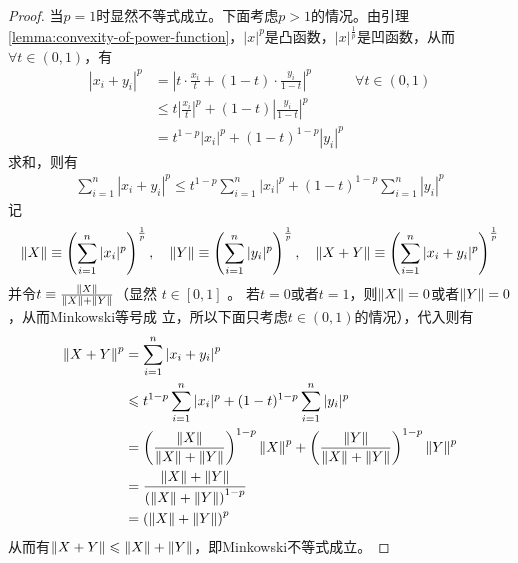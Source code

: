 \begin{proof}
  当$p=1$时显然不等式成立。下面考虑$p>1$的情况。由引理\ref{lemma:convexity-of-power-function}，$|x|^p$是凸函数，$|x|^{\frac{1}{p}}$是凹函数，从而$\forall t\in(0,1)$，有
  \begin{align*}
    \left|x_i + y_i\right|^p &= \left|t\cdot\frac{x_i}{t} + (1-t)\cdot\frac{y_i}{1-t}\right|^p & \forall t\in (0,1)\\
    &\le t \left|\frac{x_i}{t}\right|^p + (1-t)\left|\frac{y_i}{1-t}\right|^p \\
    &= t^{1-p}|x_i|^p + (1-t)^{1-p}|y_i|^p
  \end{align*}
  求和，则有
  \begin{align*}
    \sum_{i=1}^{n}\left|x_i+y_i\right|^p \le
    t^{1-p}\sum_{i=1}^{n}|x_i|^p + (1-t)^{1-p}\sum_{i=1}^{n}|y_i|^p
  \end{align*}
  记
  \begin{align*}
    \left\lVert{X}\right\rVert  \equiv\left(\sum_{i=1}^{n} |x_i|^p\right)^{\frac1p},\quad
    \left\lVert{Y}\right\rVert  \equiv\left(\sum_{i=1}^{n} |y_i|^p\right)^{\frac1p},\quad
    \left\lVert{X+Y}\right\rVert\equiv\left(\sum_{i=1}^{n} |x_i+y_i|^p\right)^{\frac1p}
  \end{align*}
  并令$t\equiv\frac{\left\lVert{X}\right\rVert}{\left\lVert{X}\right\rVert+\left\lVert{Y}\right\rVert}$（显然 $t\in[0,1]$ 。
  若$t=0$或者$t=1$，则$\left\lVert{X}\right\rVert=0$或者$\left\lVert{Y}\right\rVert=0$，从而Minkowski等号成
  立，所以下面只考虑$t\in(0,1)$的情况），代入则有
  \begin{align*}
    \left\lVert{X + Y}\right\rVert^p &= \sum_{i=1}^{n}\left|x_i+y_i\right|^p\\
    &\leqslant t^{1-p}\sum_{i=1}^{n}|x_i|^p + (1-t)^{1-p}\sum_{i=1}^{n}|y_i|^p\\
    &= \left(\frac{\left\lVert{X}\right\rVert}{\left\lVert{X}\right\rVert+\left\lVert{Y}\right\rVert}\right)^{1-p} \left\lVert{X}\right\rVert^p +
      \left(\frac{\left\lVert{Y}\right\rVert}{\left\lVert{X}\right\rVert+\left\lVert{Y}\right\rVert}\right)^{1-p} \left\lVert{Y}\right\rVert^p\\
    &=\frac{\left\lVert{X}\right\rVert+\left\lVert{Y}\right\rVert}{\left(\left\lVert{X}\right\rVert+\left\lVert{Y}\right\rVert\right)^{1-p}}\\
    &= \left(\left\lVert{X}\right\rVert+\left\lVert{Y}\right\rVert\right)^{p}
  \end{align*}
  从而有$\left\lVert{X+Y}\right\rVert\leqslant\left\lVert{X}\right\rVert+\left\lVert{Y}\right\rVert$，即Minkowski不等式成立。
\end{proof}
